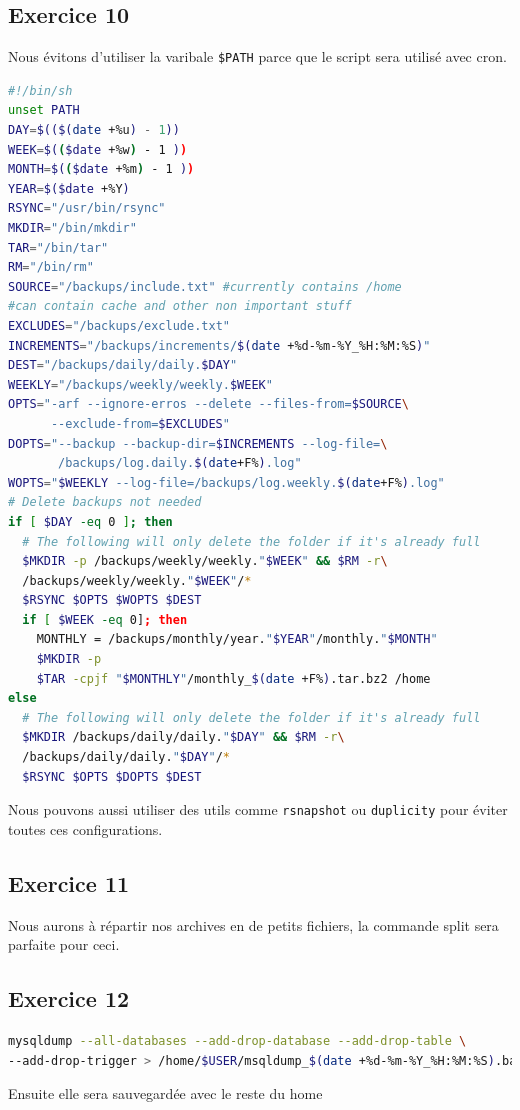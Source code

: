 \documentclass{report}
\begin{document}
\subsection{Exercice 10}
Nous évitons d'utiliser la varibale \texttt{\$PATH} parce que le script sera utilisé avec cron.
\begin{tcolorbox}
\begin{lstlisting}[language=bash]
#!/bin/sh
unset PATH
DAY=$(($(date +%u) - 1))
WEEK=$(($date +%w) - 1 ))
MONTH=$(($date +%m) - 1 ))
YEAR=$($date +%Y)
RSYNC="/usr/bin/rsync"
MKDIR="/bin/mkdir"
TAR="/bin/tar"
RM="/bin/rm"
SOURCE="/backups/include.txt" #currently contains /home
#can contain cache and other non important stuff
EXCLUDES="/backups/exclude.txt"
INCREMENTS="/backups/increments/$(date +%d-%m-%Y_%H:%M:%S)"
DEST="/backups/daily/daily.$DAY"
WEEKLY="/backups/weekly/weekly.$WEEK"
OPTS="-arf --ignore-erros --delete --files-from=$SOURCE\
      --exclude-from=$EXCLUDES"
DOPTS="--backup --backup-dir=$INCREMENTS --log-file=\
       /backups/log.daily.$(date+F%).log"
WOPTS="$WEEKLY --log-file=/backups/log.weekly.$(date+F%).log"
# Delete backups not needed
if [ $DAY -eq 0 ]; then
  # The following will only delete the folder if it's already full
  $MKDIR -p /backups/weekly/weekly."$WEEK" && $RM -r\
  /backups/weekly/weekly."$WEEK"/*
  $RSYNC $OPTS $WOPTS $DEST
  if [ $WEEK -eq 0]; then
    MONTHLY = /backups/monthly/year."$YEAR"/monthly."$MONTH"
    $MKDIR -p
    $TAR -cpjf "$MONTHLY"/monthly_$(date +F%).tar.bz2 /home
else
  # The following will only delete the folder if it's already full
  $MKDIR /backups/daily/daily."$DAY" && $RM -r\
  /backups/daily/daily."$DAY"/*
  $RSYNC $OPTS $DOPTS $DEST
\end{lstlisting}
\end{tcolorbox}
Nous pouvons aussi utiliser des utils comme \texttt{rsnapshot} ou \texttt{duplicity} pour
éviter toutes ces configurations.
\subsection{Exercice 11}
Nous aurons à répartir nos archives en de petits fichiers, la commande split sera parfaite pour
ceci.

\subsection{Exercice 12}
\begin{tcolorbox}
\begin{lstlisting}[language=bash]
mysqldump --all-databases --add-drop-database --add-drop-table \
--add-drop-trigger > /home/$USER/msqldump_$(date +%d-%m-%Y_%H:%M:%S).bak
\end{lstlisting}
\end{tcolorbox}
Ensuite elle sera sauvegardée avec le reste du home
\end{document}
